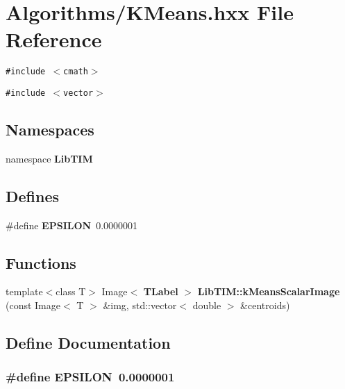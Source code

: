 \section{Algorithms/KMeans.hxx File Reference}
\label{KMeans_8hxx}
{\tt \#include $<$cmath$>$}\par
{\tt \#include $<$vector$>$}\par
\subsection*{Namespaces}
\begin{CompactItemize}
\item 
namespace {\bf Lib\-TIM}
\end{CompactItemize}
\subsection*{Defines}
\begin{CompactItemize}
\item 
\#define {\bf EPSILON}~0.0000001
\end{CompactItemize}
\subsection*{Functions}
\begin{CompactItemize}
\item 
template$<$class T$>$ Image$<$ {\bf TLabel} $>$ {\bf Lib\-TIM::k\-Means\-Scalar\-Image} (const Image$<$ T $>$ \&img, std::vector$<$ double $>$ \&centroids)
\end{CompactItemize}


\subsection{Define Documentation}
\subsubsection{\setlength{\rightskip}{0pt plus 5cm}\#define EPSILON~0.0000001}\label{KMeans_8hxx_a0}


